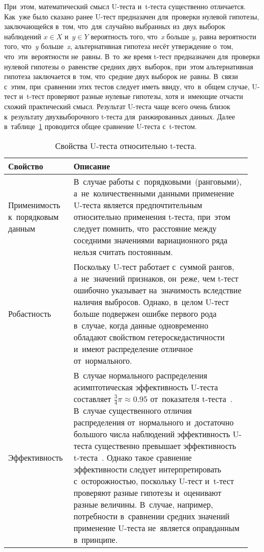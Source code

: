 \documentclass[]{scrreprt}
\begin{document}
При~этом, математический смысл U-теста и~t-теста существенно отличается. Как~уже было сказано ранее U-тест предназачен для~проверки нулевой гипотезы, заключающейся в~том, что~для~случайно выбранных из~двух выборок наблюдений ${\textstyle x \in X}$ и~${\textstyle y \in Y}$ вероятность того, что~\textit{x} больше \textit{y}, равна вероятности того, что~\textit{y} больше~\textit{x}, альтернативная гипотеза несёт утверждение о~том, что~эти~вероятности не~равны. В~то~же время t-тест предназначен для~проверки нулевой гипотезы о~равенстве средних двух~выборок, при~этом альтернативная гипотеза заключается в~том, что~средние двух выборок не~равны. В~связи с~этим, при~сравнении этих тестов следует иметь ввиду, что~в~общем случае, U-тест и~t-тест проверяют разные нулевые гипотезы, хотя и~имеющие отчасти схожий практический смысл. Результат U-теста чаще всего очень близок к~результату двухвыборочного t-теста для~ранжированных данных.
Далее в~таблице~\ref{tab:U-test-t-test-comparison} проводится общее сравнение U-теста с~t-тестом.
%
\begin{table}[ht]
	\caption{Свойства U-теста относительно t-теста.}  \label{tab:U-test-t-test-comparison}
	\centering
	\begin{tabularx}{\textwidth}{p{0.25\linewidth} p{0.7\linewidth}} 
		\hline
		Свойство&Описание\\
		\hline
		Применимость к~порядковым данным&В~случае работы с~порядковыми~(ранговыми), а~не~количественными данными применение U-теста является предпочтительным относительно применения t-теста, при~этом следует помнить, что~расстояние между соседними значениями вариационного ряда нельзя считать постоянным.\\
		\hline
		Робастность&Поскольку U-тест работает с~суммой рангов, а~не~значений признаков, он~реже, чем t-тест ошибочно указывает на~значимость вследствие наличия выбросов. Однако, в~целом U-тест больше подвержен ошибке первого рода в~случае, когда данные одновременно обладают свойством гетероскедастичности и~имеют распределение отличное от~нормального.\\
		\hline
		Эффективность&В~случае нормального распределения асимптотическая эффективность U-теста составляет $\frac{3}{4}\pi \approx 0.95$ от~показателя t-теста~\cite{U-test-efficiency}. В~случае существенного отличия распределения от~нормального и~достаточно большого числа наблюдений эффективность U-теста существенно превышает эффективность t-теста~\cite{Practical-Nonparametric-Statistics}. Однако такое сравнение эффективности следует интерпретировать с~осторожностью, поскольку U-тест и~t-тест проверяют разные гипотезы и~оценивают разные величины. В~случае, например, потребности в~сравнении средних значений применение U-теста не~является оправданным в~принципе.\\
		\hline
	\end{tabularx}
\end{table}
%
\end{document}
